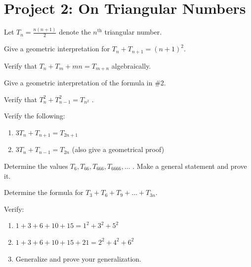 \documentclass[10pt,]{book}
\theoremstyle{plain}
\theoremstyle{definition}
\theoremstyle{definition}
\theoremstyle{definition}
\theoremstyle{definition}
\numberwithin{equation}{chapter}
\begin{document}
\section[{Project 2: On Triangular Numbers}]{Project 2: On Triangular Numbers}\label{exercises-12}
\hypertarget{p-1279}{}%
Let \(T_{n} = \frac{n\left( n + 1 \right)}{2}\) denote the \(n^{\text{th}}\) triangular number.%
\begin{divisionexercise}{1}\hypertarget{exercise-131}{}
\hypertarget{p-1280}{}%
Give a geometric interpretation for \(T_{n} + T_{n + 1} = \left( n + 1 \right)^{2}.\)%
\end{divisionexercise}%
\begin{divisionexercise}{2}\hypertarget{exercise-132}{}
\hypertarget{p-1281}{}%
Verify that \(T_{n} + T_{m} + mn = T_{m + n}\) algebraically.%
\end{divisionexercise}%
\begin{divisionexercise}{3}\hypertarget{exercise-133}{}
\hypertarget{p-1282}{}%
Give a geometric interpretation of the formula in \#2.%
\end{divisionexercise}%
\begin{divisionexercise}{4}\hypertarget{exercise-134}{}
\hypertarget{p-1283}{}%
Verify that \(T_{n}^{2} + T_{n - 1}^{2} = T_{n^{2}}\) .%
\end{divisionexercise}%
\begin{divisionexercise}{5}\hypertarget{exercise-135}{}
\hypertarget{p-1284}{}%
Verify the following: \leavevmode%
\begin{enumerate}[label=(\alph*)]
\item\hypertarget{li-246}{}\hypertarget{p-1285}{}%
\(3T_{n} + T_{n + 1} = T_{2n + 1}\)%
\item\hypertarget{li-247}{}\hypertarget{p-1286}{}%
\(3T_{n} + T_{n - 1} = T_{2n}\) (also give a geometrical proof)%
\end{enumerate}
%
\end{divisionexercise}%
\begin{divisionexercise}{6}\hypertarget{exercise-136}{}
\hypertarget{p-1287}{}%
Determine the values \(T_{6},T_{66},T_{666},T_{6666},\ldots\) . Make a general statement and prove it.%
\end{divisionexercise}%
\begin{divisionexercise}{7}\hypertarget{exercise-137}{}
\hypertarget{p-1288}{}%
Determine the formula for \(T_{3} + T_{6} + T_{9} + \ldots + T_{3n}.\)%
\end{divisionexercise}%
\begin{divisionexercise}{8}\hypertarget{exercise-138}{}
\hypertarget{p-1289}{}%
Verify: \leavevmode%
\begin{enumerate}[label=(\alph*)]
\item\hypertarget{li-248}{}\hypertarget{p-1290}{}%
\(1 + 3 + 6 + 10 + 15 = 1^{2} + 3^{2} + 5^{2}\)%
\item\hypertarget{li-249}{}\hypertarget{p-1291}{}%
\(1 + 3 + 6 + 10 + 15 + 21 = 2^{2} + 4^{2} + 6^{2}\)%
\item\hypertarget{li-250}{}\hypertarget{p-1292}{}%
Generalize and prove your generalization.%
\end{enumerate}
%
\end{divisionexercise}%
\end{document}
